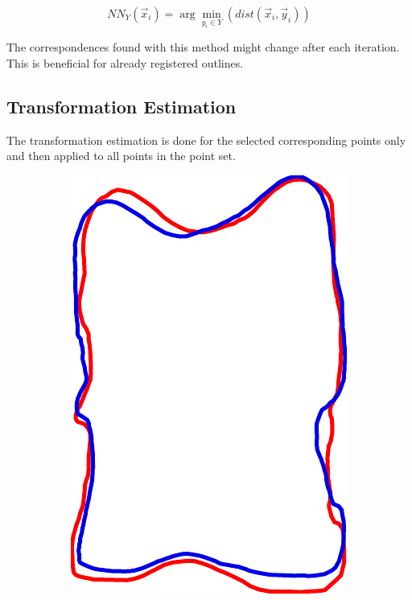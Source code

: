 \documentclass[pdftex,12pt,a4paper]{report}
\begin{document}
\begin{equation}
NN_Y(\vec{x}_i) = \arg\min_{y_i \in Y}(dist(\vec{x}_i, \vec{y}_i))
\end{equation}

The correspondences found with this method might change after each iteration. This is beneficial for already registered
outlines.

\subsection{Transformation Estimation}

The transformation estimation is done for the selected corresponding points only and then applied to all points in
the point set.

\begin{figure}[h]
	\centering
	\begin{subfigure}[b]{0.24\textwidth}
		\centering
		\includegraphics[width=.85\linewidth]{img/registration/single-before.pdf}

\end{subfigure}
\end{figure}
\end{document}
